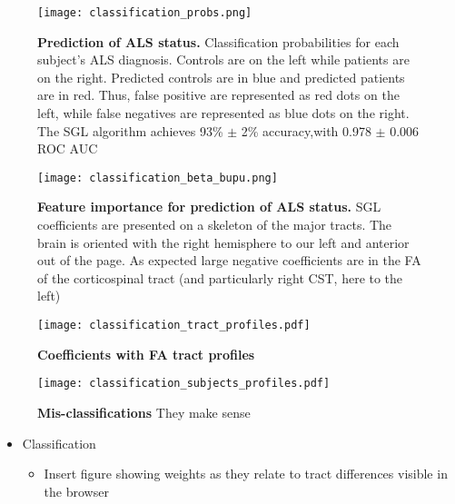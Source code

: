 \begin{figure}[!h]
    \centering
    \texttt{[image: classification\_probs.png]}
    \caption{{\bf Prediction of ALS status.}
        Classification probabilities for each subject's ALS diagnosis. Controls
        are on the left while patients are on the right. Predicted controls are in blue
        and predicted patients are in red. Thus, false positive are represented as red
        dots on the left, while false negatives are represented as blue dots on the
        right. The SGL algorithm achieves 93\% $\pm$ 2\% accuracy,with 0.978 $\pm$ 0.006
        ROC AUC}
    \label{fig:class-results}
\end{figure}

\begin{figure}[!h]
    \centering
    \texttt{[image: classification\_beta\_bupu.png]}
    \caption{{\bf Feature importance for prediction of ALS status.}
        SGL coefficients are presented on a skeleton of the major tracts. The
    brain is oriented with the right hemisphere to our left and anterior out of
    the page. As expected large negative coefficients are in the FA of the
    corticospinal tract (and particularly right CST, here to the left)}
    \label{fig:class-beta}
\end{figure}


\begin{figure}[!h]
    \centering
    \texttt{[image: classification\_tract\_profiles.pdf]}
    \caption{{\bf Coefficients with FA tract profiles}
       }
    \label{fig:class-profiles}
\end{figure}


\begin{figure}[!h]
    \centering
    \texttt{[image: classification\_subjects\_profiles.pdf]}
    \caption{{\bf Mis-classifications}
       They make sense}
    \label{fig:class-errors}
\end{figure}


\begin{itemize}
  \item Classification
    \begin{itemize}
      \item Insert figure showing weights as they relate to tract differences visible in the browser
    \end{itemize}
\end{itemize}

